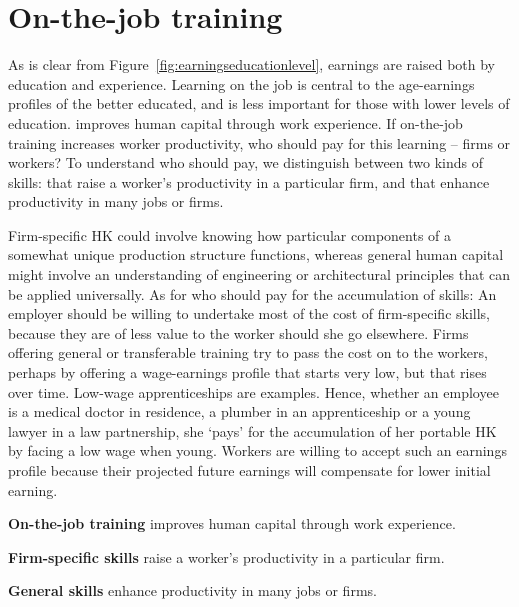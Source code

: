 \section{On-the-job training}\label{sec:ch13sec3}

As is clear from Figure~\ref{fig:earningseducationlevel}, earnings are
raised both by education and experience. Learning on the job is central to
the age-earnings profiles of the better educated, and is less important for
those with lower levels of education. 
improves human capital through work experience. If on-the-job training
increases worker productivity, who should pay for this learning -- firms or
workers? To understand who should pay, we distinguish between two kinds of
skills:  that raise a worker's
productivity in a particular firm, and  that
enhance productivity in many jobs or firms.

Firm-specific HK could involve knowing how particular components of a
somewhat unique production structure functions, whereas general human
capital might involve an understanding of engineering or architectural
principles that can be applied universally. As for who should pay for the
accumulation of skills: An employer should be willing to undertake most of
the cost of firm-specific skills, because they are of less value to the
worker should she go elsewhere. Firms offering general or transferable
training try to pass the cost on to the workers, perhaps by offering a
wage-earnings profile that starts very low, but that rises over time.
Low-wage apprenticeships are examples. Hence, whether an employee is a
medical doctor in residence, a plumber in an apprenticeship or a young
lawyer in a law partnership, she `pays' for the accumulation of her portable
HK by facing a low wage when young. Workers are willing to accept such an
earnings profile because their projected future earnings will compensate for
lower initial earning.

\begin{DefBox}
	\textbf{On-the-job training} improves human capital through work experience.
	
	\textbf{Firm-specific skills} raise a worker's productivity in a particular firm.
	
	\textbf{General skills} enhance productivity in many jobs or firms.
\end{DefBox}